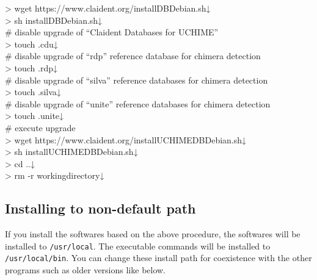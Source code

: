 \documentclass[titlepage,10pt,a4paper,english]{jsbook}
\newenvironment{cmd}{\begin{oframed}\raggedright\ttfamily\footnotesize\setlength{\baselineskip}{1.4em}}{\end{oframed}\vspace{-1em}}
\begin{document}
\begin{cmd}
{\textgreater} wget https://www.claident.org/installDB{\textunderscore}Debian.sh↓\\
{\textgreater} sh installDB{\textunderscore}Debian.sh↓\\
\# disable upgrade of ``Claident Databases for UCHIME''\\
{\textgreater} touch .cdu↓\\
\# disable upgrade of ``rdp'' reference database for chimera detection\\
{\textgreater} touch .rdp↓\\
\# disable upgrade of ``silva'' reference databases for chimera detection\\
{\textgreater} touch .silva↓\\
\# disable upgrade of ``unite'' reference databases for chimera detection\\
{\textgreater} touch .unite↓\\
\# execute upgrade\\
{\textgreater} wget https://www.claident.org/installUCHIMEDB{\textunderscore}Debian.sh↓\\
{\textgreater} sh installUCHIMEDB{\textunderscore}Debian.sh↓\\
{\textgreater} cd ..↓\\
{\textgreater} rm -r workingdirectory↓
\end{cmd}

\subsection{Installing to non-default path}

If you install the softwares based on the above procedure, the softwares will be installed to \texttt{/usr/local}.
The executable commands will be installed to \texttt{/usr/local/bin}.
You can change these install path for coexistence with the other programs such as older versions like below.
\end{document}
